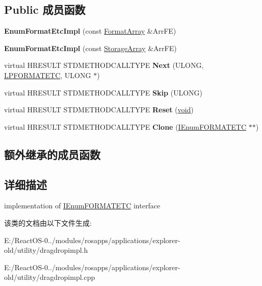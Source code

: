\subsection*{Public 成员函数}
\begin{DoxyCompactItemize}
\item 
\mbox{\label{class_enum_format_etc_impl_a47508bfb76588eb3fb25cb43557e2ef2}} 
{\bfseries Enum\+Format\+Etc\+Impl} (const \hyperlink{structvector}{Format\+Array} \&Arr\+FE)
\item 
\mbox{\label{class_enum_format_etc_impl_a22bf2bae4e6fd285be4cc14dc5693060}} 
{\bfseries Enum\+Format\+Etc\+Impl} (const \hyperlink{structvector}{Storage\+Array} \&Arr\+FE)
\item 
\mbox{\label{class_enum_format_etc_impl_a63b354067c53257a68896079d492295b}} 
virtual H\+R\+E\+S\+U\+LT S\+T\+D\+M\+E\+T\+H\+O\+D\+C\+A\+L\+L\+T\+Y\+PE {\bfseries Next} (U\+L\+O\+NG, \hyperlink{struct_i_enum_f_o_r_m_a_t_e_t_c_1_1tag_f_o_r_m_a_t_e_t_c}{L\+P\+F\+O\+R\+M\+A\+T\+E\+TC}, U\+L\+O\+NG $\ast$)
\item 
\mbox{\label{class_enum_format_etc_impl_a3447b5c7fd7314a897c98e3e719e26de}} 
virtual H\+R\+E\+S\+U\+LT S\+T\+D\+M\+E\+T\+H\+O\+D\+C\+A\+L\+L\+T\+Y\+PE {\bfseries Skip} (U\+L\+O\+NG)
\item 
\mbox{\label{class_enum_format_etc_impl_ad274b2305f64b4cdf9e3a87593f90bbe}} 
virtual H\+R\+E\+S\+U\+LT S\+T\+D\+M\+E\+T\+H\+O\+D\+C\+A\+L\+L\+T\+Y\+PE {\bfseries Reset} (\hyperlink{interfacevoid}{void})
\item 
\mbox{\label{class_enum_format_etc_impl_a45a573f0fa799987189c794c9133aa7d}} 
virtual H\+R\+E\+S\+U\+LT S\+T\+D\+M\+E\+T\+H\+O\+D\+C\+A\+L\+L\+T\+Y\+PE {\bfseries Clone} (\hyperlink{interface_i_enum_f_o_r_m_a_t_e_t_c}{I\+Enum\+F\+O\+R\+M\+A\+T\+E\+TC} $\ast$$\ast$)
\end{DoxyCompactItemize}
\subsection*{额外继承的成员函数}


\subsection{详细描述}
implementation of \hyperlink{interface_i_enum_f_o_r_m_a_t_e_t_c}{I\+Enum\+F\+O\+R\+M\+A\+T\+E\+TC} interface 

该类的文档由以下文件生成\+:\begin{DoxyCompactItemize}
\item 
E\+:/\+React\+O\+S-\/0../modules/rosapps/applications/explorer-\/old/utility/dragdropimpl.\+h\item 
E\+:/\+React\+O\+S-\/0../modules/rosapps/applications/explorer-\/old/utility/dragdropimpl.\+cpp\end{DoxyCompactItemize}
